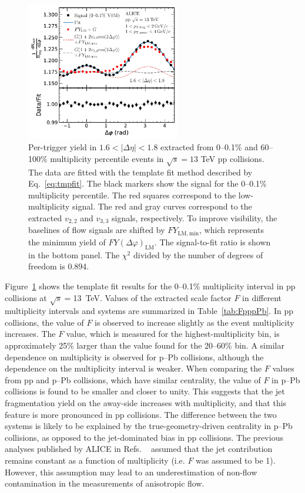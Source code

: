 \begin{figure}[h!]
	\centering
	\hspace{-3em}\includegraphics[width=0.6\textwidth]{figures/FIG2_FlowExt.pdf} 
	\caption{Per-trigger yield in $1.6<|\Delta\eta|<1.8$ extracted from 0--0.1\% and 60--100\% multiplicity percentile events in $\sqrt{s}=13$ TeV pp collisions. The data are fitted with the template fit method described by Eq.~\ref{eq:tmpfit}. The black markers show the signal for the 0--0.1\% multiplicity percentile. The red squares correspond to the low-multiplicity signal. The red and gray curves correspond to the extracted $v_{2,2}$ and $v_{3,3}$ signals, respectively. To improve visibility, the baselines of flow signals are shifted by $FY_{\mathrm{LM,min}}$, which represents the minimum yield of $FY(\Delta\varphi)_{\mathrm{LM}}$. The signal-to-fit ratio is shown in the bottom panel. The $\chi^{2}$ divided by the number of degrees of freedom is 0.894.}
	\label{fig:flowext}
\end{figure}

Figure~\ref{fig:flowext} shows the template fit results for the 0--0.1\% multiplicity interval in pp collisions at $\sqrt{s} = $13~TeV. Values of the extracted scale factor $F$ in different multiplicity intervals and systems are summarized in Table~\ref{tab:FpppPb}. In pp collisions, the value of $F$ is observed to increase slightly as the event multiplicity increases. The $F$ value, which is measured for the highest-multiplicity bin, is approximately 25\% larger than the value found for the 20–60\% bin. A similar dependence on multiplicity is observed for p--Pb collisions, although the dependence on the multiplicity interval is weaker. When comparing the $F$ values from pp and p–Pb collisions, which have similar centrality, the value of $F$ in p--Pb collisions is found to be smaller and closer to unity.
This suggests that the jet fragmentation yield on the away-side increases with multiplicity, and that this feature is more pronounced in pp collisions. The difference between the two systems is likely to be explained by the true-geometry-driven centrality in p--Pb collisions, as opposed to the jet-dominated bias in pp collisions.
The previous analyses published by ALICE in Refs. ~\cite{ALICE:2012eyl,ALICE:2013snk} assumed that the jet contribution remains constant as a function of multiplicity (i.e. $F$ was assumed to be 1). However, this assumption may lead to an underestimation of non-flow contamination in the measurements of anisotropic flow.

